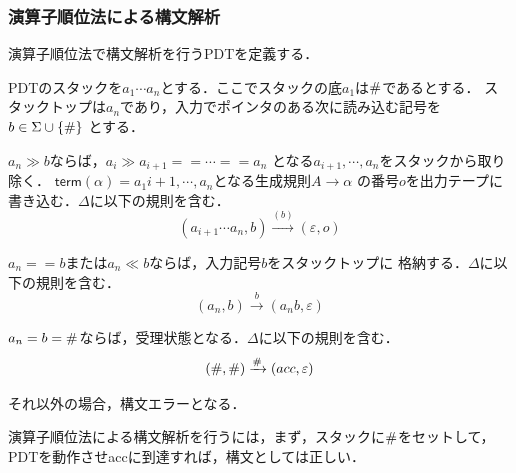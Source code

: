 \documentclass[a4j,dvipdfmx]{jbook}
\begin{document}
\subsubsection{演算子順位法による構文解析}

演算子順位法で構文解析を行うPDTを定義する．

PDTのスタックを$a_1\cdots a_n$とする．ここでスタックの底$a_1$は${\tt \#}$であるとする．
スタックトップは$a_n$であり，入力でポインタのある次に読み込む記号を$b\in\Sigma\cup\{{\tt \#}\}$
とする．
\begin{list}{}{}
  \item [{\bf 還元}] $a_n\gg b$ならば，$a_i\gg a_{i+1}==\cdots==a_n$
        となる$a_{i+1},\cdots,a_n$をスタックから取り除く．
        $\mathsf{term}(\alpha)=a_1{i+1},\cdots,a_n$となる生成規則$A\rightarrow\alpha$
        の番号$o$を出力テープに書き込む．$\Delta$に以下の規則を含む．
        \[(a_{i+1}\cdots a_n,b)\xrightarrow{(b)}(\varepsilon,o)\]
  \item [{\bf シフト}] $a_n==b$または$a_n\ll b$ならば，入力記号$b$をスタックトップに
        格納する．$\Delta$に以下の規則を含む．
        \[(a_n,b)\xrightarrow{b}(a_nb,\varepsilon)\]
  \item [{\bf 受理}] $a_n=b={\tt \#}$ならば，受理状態となる．$\Delta$に以下の規則を含む．
        \[({\tt \#},{\tt \#})\xrightarrow{{\tt \#}}(acc,\varepsilon)\]
  \item [{\bf エラー}] それ以外の場合，構文エラーとなる．
\end{list}

演算子順位法による構文解析を行うには，まず，スタックに${\tt \#}$をセットして，
PDTを動作させaccに到達すれば，構文としては正しい．
\end{document}
